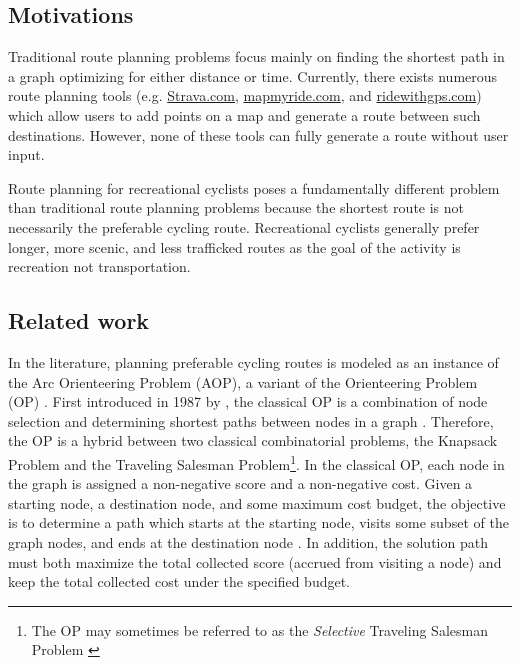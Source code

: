 \documentclass[11pt]{article}
\newcommand{\td}{\todo[inline]}
\begin{document}
\subsection{Motivations}
Traditional route planning problems focus mainly on finding the shortest path in a graph optimizing for either distance or time. Currently, there exists numerous route planning tools (e.g. \href{https://www.strava.com/routes/new}{Strava.com}, \href{https://www.mapmyride.com}{mapmyride.com}, and \href{https://ridewithgps.com}{ridewithgps.com}) which allow users to add points on a map and generate a route between such destinations. However, none of these tools can fully generate a route without user input.

Route planning for recreational cyclists poses a fundamentally different problem than traditional route planning problems because the shortest route is not necessarily the 	preferable cycling route. Recreational cyclists generally prefer longer, more scenic, and less trafficked routes as the goal of the activity is recreation not transportation. 



\subsection{Related work} \label{relatedwork}
In the literature, planning preferable cycling routes is modeled as an instance of the Arc Orienteering Problem (AOP), a variant of the Orienteering Problem (OP) \cite{souffriau2011planning}. First introduced in 1987 by \citeauthor{golden1987orienteering}, the classical OP is a combination of node selection and determining shortest paths between nodes in a graph \cite{golden1987orienteering}. Therefore, the OP is a hybrid between two classical combinatorial problems, the Knapsack Problem and the Traveling Salesman Problem\footnote{The OP may sometimes be referred to as the \emph{Selective} Traveling Salesman Problem \cite{laporte1990selective}}. In the classical OP, each node in the graph is assigned a non-negative score and a non-negative cost. Given a starting node, a destination node, and some maximum cost budget, the objective is to determine a path which starts at the starting node, visits some subset of the graph nodes, and ends at the destination node \cite{gunawan2016orienteering}. In addition, the solution path must both maximize the total collected score (accrued from visiting a node) and keep the total collected cost under the specified budget.
\end{document}
